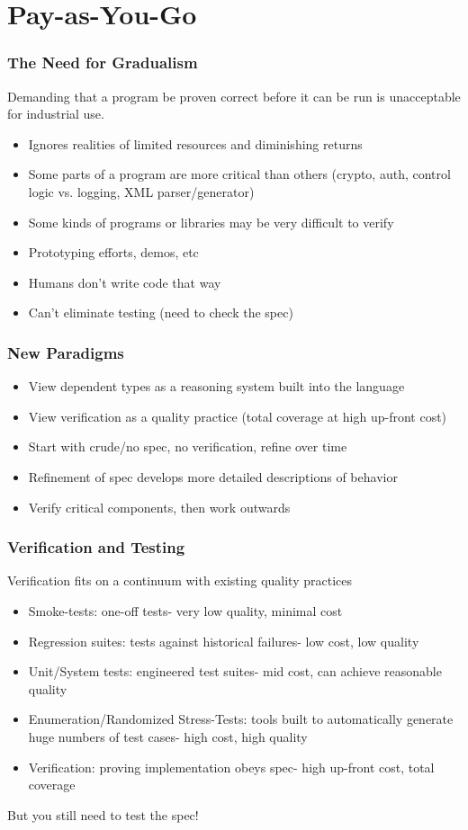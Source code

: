 \documentclass{beamer}
\begin{document}
\section{Pay-as-You-Go}

\begin{frame}
  \frametitle{The Need for Gradualism}

  Demanding that a program be proven correct before it can be run is
  unacceptable for industrial use.
  \begin{itemize}
    \item Ignores realities of limited resources and diminishing returns
    \item Some parts of a program are more critical than others
      (crypto, auth, control logic vs. logging, XML parser/generator)
    \item Some kinds of programs or libraries may be very difficult to verify
    \item Prototyping efforts, demos, etc
    \item Humans don't write code that way
    \item Can't eliminate testing (need to check the spec)
  \end{itemize}
\end{frame}

\begin{frame}
  \frametitle{New Paradigms}
  \begin{itemize}
    \item View dependent types as a reasoning system built into the language
    \item View verification as a quality practice (total coverage at
      high up-front cost)
    \item Start with crude/no spec, no verification, refine over time
    \item Refinement of spec develops more detailed descriptions of behavior
    \item Verify critical components, then work outwards
  \end{itemize}
\end{frame}

\begin{frame}
  \frametitle{Verification and Testing}
  Verification fits on a continuum with existing quality practices
  \begin{itemize}
    \item Smoke-tests: one-off tests- very low quality, minimal cost
    \item Regression suites: tests against historical failures- low
      cost, low quality
    \item Unit/System tests: engineered test suites- mid cost, can
      achieve reasonable quality
    \item Enumeration/Randomized Stress-Tests: tools built to
      automatically generate huge numbers of test cases- high cost, high quality
    \item Verification: proving implementation obeys spec- high
      up-front cost, total coverage
  \end{itemize}
  But you still need to test the spec!
\end{frame}
\end{document}
